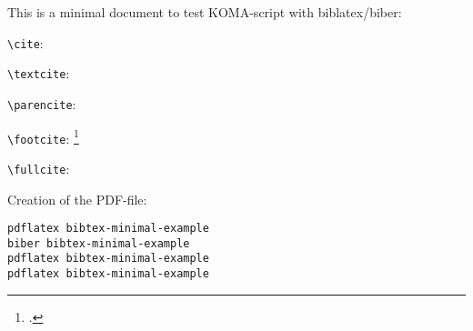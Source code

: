 \documentclass[12pt,a4paper,parskip=half]{scrartcl}
\begin{document}
This is a minimal document to test KOMA-script with biblatex/biber:

\verb+\cite+: \cite{Voit2012b}

\verb+\textcite+: \textcite{Voit2012b}

\verb+\parencite+: \parencite{Voit2012b}

\verb+\footcite+: \footcite{Voit2012b}

\verb+\fullcite+: 

Creation of the PDF-file:
\begin{verbatim}
pdflatex bibtex-minimal-example
biber bibtex-minimal-example
pdflatex bibtex-minimal-example
pdflatex bibtex-minimal-example
\end{verbatim}

\printbibliography
\end{document}
